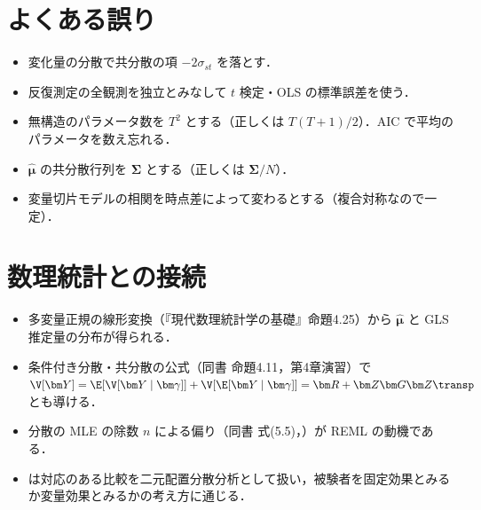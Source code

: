 \section{よくある誤り}\label{sec:08-err}
\begin{warnbox}
\begin{itemize}
\item 変化量の分散で共分散の項 $-2\sigma_{st}$ を落とす．
\item 反復測定の全観測を独立とみなして $t$ 検定・OLS の標準誤差を使う．
\item 無構造のパラメータ数を $T^2$ とする（正しくは $T(T+1)/2$）．AIC で平均のパラメータを数え忘れる．
\item $\hat{\bm\mu}$ の共分散行列を $\bm\Sigma$ とする（正しくは $\bm\Sigma/N$）．
\item 変量切片モデルの相関を時点差によって変わるとする（複合対称なので一定）．
\end{itemize}
\end{warnbox}

\section{数理統計との接続}\label{sec:08-link}
\begin{linkbox}
\begin{itemize}
\item 多変量正規の線形変換（『現代数理統計学の基礎』命題4.25）から $\hat{\bm\mu}$ と GLS 推定量の分布が得られる．
\item 条件付き分散・共分散の公式（同書 命題4.11，第4章演習）で $\V[\bm Y]=\E[\V[\bm Y\mid\bm\gamma]]+\V[\E[\bm Y\mid\bm\gamma]]=\bm R+\bm Z\bm G\bm Z\transp$ とも導ける．
\item 分散の MLE の除数 $n$ による偏り（同書 式(5.5)，）が REML の動機である．
\item {} は対応のある比較を二元配置分散分析として扱い，被験者を固定効果とみるか変量効果とみるかの考え方に通じる．
\end{itemize}
\end{linkbox}

